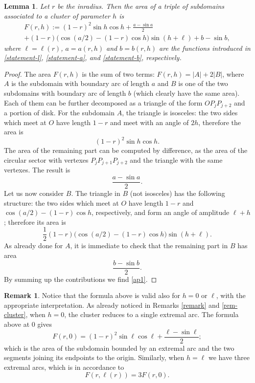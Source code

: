 \documentclass[11pt]{article}
\numberwithin{equation}{section}
\theoremstyle{plain}
\newtheorem{lemma}[theorem]{Lemma}
\theoremstyle{definition}
\newtheorem{remark}[theorem]{Remark}
\begin{document}
\begin{lemma}\label{lem-F} Let $r$ be the inradius. Then the area of a triple of subdomains associated to a cluster of parameter $h$ is
\begin{multline}\label{ap1}
F(r,h):=(1-r)^2 \sin h \cos h +\frac{a-\sin a}{2}\\
+(1-r) \bigl(\cos(a/2)-(1-r)\cos h\bigr) \sin(h+\ell) +b-\sin b,
\end{multline}
where $\ell=\ell(r)$, $a=a(r,h)$ and $b=b(r,h)$ are the functions introduced in \eqref{statement-l}, \eqref{statement-a}, and \eqref{statement-b}, respectively.
\end{lemma}
\begin{proof} The area $F(r,h)$ is the sum of two terms: $F(r,h)=|A|+2|B|$, where $A$ is the subdomain with boundary arc of length $a$ and $B$ is one of the two subdomains with boundary arc of length $b$ (which clearly have the same area).
Each of them can be further decomposed as a triangle of the form $OP_jP_{j+2}$ and a portion of disk.
For the subdomain $A$, the triangle is isosceles: the two sides which meet at $O$ have length $1-r$ and meet with an angle of $2h$, therefore the area is
\[
(1-r)^2\sin h \cos h.
\]
The area of the remaining part can be computed by difference, as the area of the circular sector with vertexes $P_jP_{j+1}P_{j+2}$ and the triangle with the same vertexes. The result is
\[
\frac{a-\sin a}{2}.
\]
Let us now consider $B$. The triangle in $B$ (not isosceles) has the following structure: the two sides which meet at $O$ have length $1-r$ and $\cos(a/2) - (1-r)\cos h$, respectively, and form an angle of amplitude $\ell + h$; therefore its area is
\[
\frac12 (1-r) \big(\cos(a/2)-(1-r)\cos h\big) \sin(h+\ell).
\]
As already done for $A$, it is immediate to check that the remaining part in $B$ has area
\[
\frac{b-\sin b}{2}.
\]
By summing up the contributions we find \eqref{ap1}. \end{proof}
\begin{remark}\label{maybe}
Notice that the formula above is valid also for $h= 0 $ or $\ell$, with the appropriate interpretation. As already noticed in Remarks \ref{remark} and \ref{rem-cluster}, when $h=0$, the cluster reduces to a single extremal arc. The formula above at 0 gives
\[
F(r,0)=(1-r)^2\sin \ell \cos\ell + \frac{\ell - \sin \ell}{2};
\]
which is the area of the subdomain bounded by an extremal arc and the two segments joining its endpoints to the origin.
Similarly, when $h=\ell$ we have three extremal arcs, which is in accordance to
\[
F(r,\ell(r))=3F(r,0).
\]
\end{remark}
\end{document}
